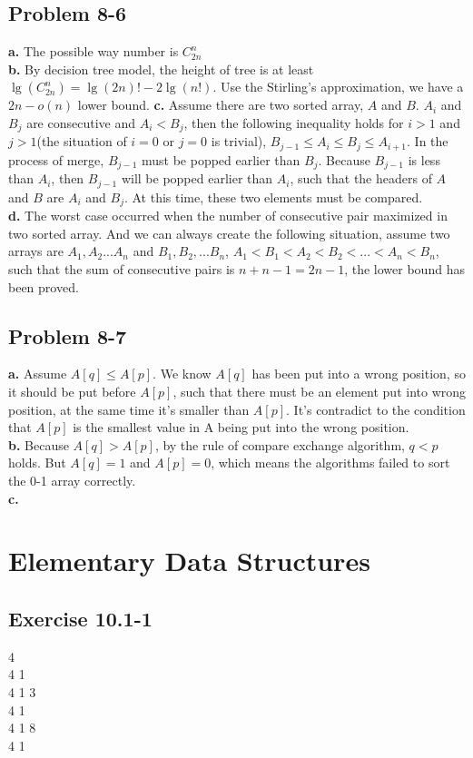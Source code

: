 \documentclass[12pt]{article}
\theoremstyle{definition}
\theoremstyle{remark}
\begin{document}
\subsection*{Problem 8-6}
\textbf{a.} The possible way number is $C_{2n}^n$\\
\textbf{b.} By decision tree model, the height of tree is at least $\lg(C_{2n}^n)=\lg(2n)!-2\lg(n!)$. Use the Stirling's approximation, we have a $2n-o(n)$ lower bound.
\textbf{c.} Assume there are two sorted array, $A$ and $B$. $A_i$ and $B_j$ are consecutive and $A_i<B_j$, then the following inequality holds for $i>1$ and $j>1$(the situation of $i=0$ or $j=0$ is trivial), $B_{j-1}\le A_i\le B_j\le A_{i+1}$. In the process of merge, $B_{j-1}$ must be popped earlier than $B_j$. Because $B_{j-1}$ is less than $A_i$, then $B_{j-1}$ will be popped earlier than $A_i$, such that the headers of $A$ and $B$ are $A_i$ and $B_j$. At this time, these two elements must be compared.\\
\textbf{d.} The worst case occurred when the number of consecutive pair maximized in two sorted array. And we can always create the following situation, assume two arrays are $A_1,A_2...A_n$ and $B_1,B_2,...B_n$, $A_1<B_1<A_2<B_2<...<A_n<B_n$, such that the sum of consecutive pairs is $n+n-1=2n-1$, the lower bound has been proved.
\subsection*{Problem 8-7}
\textbf{a.} Assume $A[q]\le A[p]$. We know $A[q]$ has been put into a wrong position, so it should be put before $A[p]$, such that there must be an element put into wrong position, at the same time it's smaller than $A[p]$. It's contradict to the condition that $A[p]$ is the smallest value in A being put into the wrong position.\\
\textbf{b.} Because $A[q]>A[p]$, by the rule of compare exchange algorithm, $q<p$ holds. But $A[q]=1$ and $A[p]=0$, which means the algorithms failed to sort the 0-1 array correctly.\\
\textbf{c.}
\section{Elementary Data Structures}
\subsection*{Exercise 10.1-1}
4\\
4 1\\
4 1 3\\
4 1\\
4 1 8\\
4 1
\end{document}
